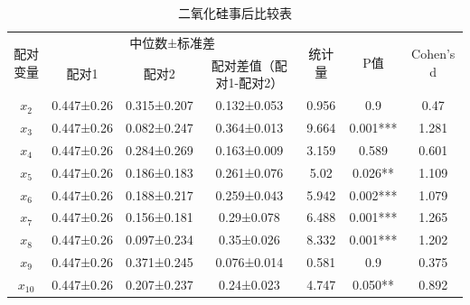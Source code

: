 \documentclass[UTF8]{ctexart}
\begin{document}
\begin{table}[H]
    \centering
    \caption{二氧化硅事后比较表}
    \begin{tabular}{|c|c|c|c|c|c|c|}
        \hline
        \multirow{2}{*}{配对变量} & \multicolumn{3}{|c|}{中位数±标准差} & \multirow{2}{*}{统计量} & \multirow{2}{*}{P值}    & \multirow{2}{*}{Cohen's d}                    \\ \cline{2-4}
        ~                         & 配对1                               & 配对2                   & 配对差值（配对1-配对2） & ~                          & ~        & ~     \\ \hline
        $x_{2}$                   & 0.447±0.26                          & 0.315±0.207             & 0.132±0.053             & 0.956                      & 0.9      & 0.47  \\ \hline
        $x_{3}$                   & 0.447±0.26                          & 0.082±0.247             & 0.364±0.013             & 9.664                      & 0.001*** & 1.281 \\ \hline
        $x_{4}$                   & 0.447±0.26                          & 0.284±0.269             & 0.163±0.009             & 3.159                      & 0.589    & 0.601 \\ \hline
        $x_{5}$                   & 0.447±0.26                          & 0.186±0.183             & 0.261±0.076             & 5.02                       & 0.026**  & 1.109 \\ \hline
        $x_{6}$                   & 0.447±0.26                          & 0.188±0.217             & 0.259±0.043             & 5.942                      & 0.002*** & 1.079 \\ \hline
        $x_{7}$                   & 0.447±0.26                          & 0.156±0.181             & 0.29±0.078              & 6.488                      & 0.001*** & 1.265 \\ \hline
        $x_{8}$                   & 0.447±0.26                          & 0.097±0.234             & 0.35±0.026              & 8.332                      & 0.001*** & 1.202 \\ \hline
        $x_{9}$                   & 0.447±0.26                          & 0.371±0.245             & 0.076±0.014             & 0.581                      & 0.9      & 0.375 \\ \hline
        $x_{10}$                  & 0.447±0.26                          & 0.207±0.237             & 0.24±0.023              & 4.747                      & 0.050**  & 0.892 \\ \hline

\end{tabular}
\end{table}
\end{document}
